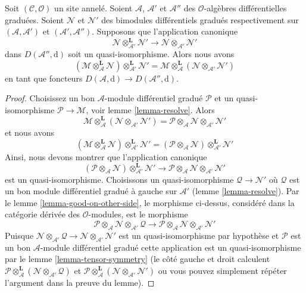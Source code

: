 \begin{lemma}
\label{lemma-compose-tensor}
Soit $(\mathcal{C}, \mathcal{O})$ un site annelé.
Soient $\mathcal{A}$, $\mathcal{A}'$ et $\mathcal{A}''$ des $\mathcal{O}$-algèbres différentielles graduées.
Soient $\mathcal{N}$ et $\mathcal{N}'$ des bimodules différentiels gradués respectivement sur $(\mathcal{A}, \mathcal{A}')$ et $(\mathcal{A}', \mathcal{A}'')$.
Supposons que l'application canonique
$$
\mathcal{N} \otimes_{\mathcal{A}'}^\mathbf{L} \mathcal{N}'
\longrightarrow
\mathcal{N} \otimes_{\mathcal{A}'} \mathcal{N}'
$$
dans $D(\mathcal{A}'', \text{d})$ soit un quasi-isomorphisme.
Alors nous avons
$$
(\mathcal{M}
\otimes_\mathcal{A}^\mathbf{L} \mathcal{N})
\otimes_{\mathcal{A}'}^\mathbf{L} \mathcal{N}'
=
\mathcal{M}
\otimes_\mathcal{A}^\mathbf{L}
(\mathcal{N} \otimes_{\mathcal{A}'} \mathcal{N}')
$$
en tant que foncteurs $D(\mathcal{A}, \text{d}) \to D(\mathcal{A}'', \text{d})$.
\end{lemma}

\begin{proof}
Choisissez un bon $\mathcal{A}$-module différentiel gradué $\mathcal{P}$ et un quasi-isomorphisme $\mathcal{P} \to \mathcal{M}$, voir lemme \ref{lemma-resolve}.
Alors
$$
\mathcal{M}
\otimes_\mathcal{A}^\mathbf{L}
(\mathcal{N} \otimes_{\mathcal{A}'} \mathcal{N}') =
\mathcal{P} \otimes_\mathcal{A} \mathcal{N}
\otimes_{\mathcal{A}'} \mathcal{N}'
$$
et nous avons
$$
(\mathcal{M}
\otimes_\mathcal{A}^\mathbf{L} \mathcal{N})
\otimes_{\mathcal{A}'}^\mathbf{L} \mathcal{N}' =
(\mathcal{P} \otimes_\mathcal{A} \mathcal{N})
\otimes_{\mathcal{A}'}^\mathbf{L} \mathcal{N}'
$$
Ainsi, nous devons montrer que l'application canonique
$$
(\mathcal{P} \otimes_\mathcal{A} \mathcal{N})
\otimes_{\mathcal{A}'}^\mathbf{L} \mathcal{N}'
\longrightarrow
\mathcal{P} \otimes_\mathcal{A} \mathcal{N}
\otimes_{\mathcal{A}'} \mathcal{N}'
$$
est un quasi-isomorphisme.
Choisissons un quasi-isomorphisme $\mathcal{Q} \to \mathcal{N}'$ où $\mathcal{Q}$ est un bon module différentiel gradué à gauche sur $\mathcal{A}'$ (lemme \ref{lemma-resolve}).
Par le lemme \ref{lemma-good-on-other-side}, le morphisme ci-dessus, considéré dans la catégorie dérivée des $\mathcal{O}$-modules, est le morphisme
$$
\mathcal{P} \otimes_\mathcal{A} \mathcal{N}
\otimes_{\mathcal{A}'} \mathcal{Q}
\longrightarrow
\mathcal{P} \otimes_\mathcal{A} \mathcal{N}
\otimes_{\mathcal{A}'} \mathcal{N}'
$$
Puisque $\mathcal{N} \otimes_{\mathcal{A}'} \mathcal{Q} \to \mathcal{N} \otimes_{\mathcal{A}'} \mathcal{N}'$ est un quasi-isomorphisme par hypothèse et $\mathcal{P}$ est un bon $\mathcal{A}$-module différentiel gradué cette application est un quasi-isomorphisme par le lemme \ref{lemma-tensor-symmetry} (le côté gauche et droit calculent $\mathcal{P} \otimes_\mathcal{A}^\mathbf{L} (\mathcal{N} \otimes_{\mathcal{A}'} \mathcal{Q})$ et $\mathcal{P} \otimes_\mathcal{A}^\mathbf{L} (\mathcal{N} \otimes_{\mathcal{A}'} \mathcal{N}')$ ou vous pouvez simplement répéter l'argument dans la preuve du lemme).
\end{proof}







